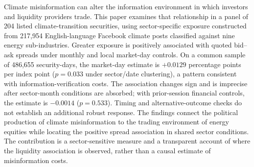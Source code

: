Climate misinformation can alter the information environment in which investors and liquidity providers trade. This paper examines that relationship in a panel of 204 listed climate-transition securities, using sector-specific exposure constructed from 217,954 English-language Facebook climate posts classified against nine energy sub-industries. Greater exposure is positively associated with quoted bid--ask spreads under monthly and local market-day controls. On a common sample of 486,655 security-days, the market-day estimate is $+0.0129$ percentage points per index point ($p=0.033$ under sector/date clustering), a pattern consistent with information-verification costs. The association changes sign and is imprecise after sector-month conditions are absorbed; with prior-session financial controls, the estimate is $-0.0014$ ($p=0.533$). Timing and alternative-outcome checks do not establish an additional robust response. The findings connect the political production of climate misinformation to the trading environment of energy equities while locating the positive spread association in shared sector conditions. The contribution is a sector-sensitive measure and a transparent account of where the liquidity association is observed, rather than a causal estimate of misinformation costs.
